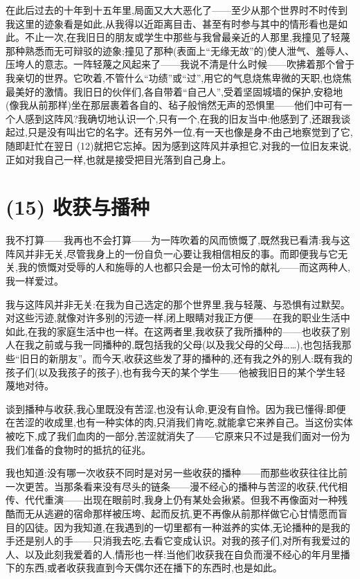 在此后过去的十年到十五年里,局面又大大恶化了——至少从那个世界时不时传到我这里的迹象看是如此,从我得以近距离目击、甚至有时参与其中的情形看也是如此。不止一次,在我旧日的朋友或学生中那些与我曾最亲近的人那里,我撞见了轻蔑那种熟悉而无可辩驳的迹象;撞见了那种(表面上“无缘无故”的)使人泄气、羞辱人、压垮人的意志。一阵轻蔑之风起来了——我说不清是什么时候——吹拂着那个曾于我亲切的世界。它吹着,不管什么“功绩”或“过”,用它的气息烧焦卑微的天职,也烧焦最美好的激情。我旧日的伙伴们,各自带着“自己人”,受着坚固城墙的保护,安稳地(像我从前那样)坐在那层裹着各自的、毡子般悄然无声的恐惧里——他们中可有一个人感到这阵风?我确切地认识一个,只有一个,在我的旧友当中:他感到了,还跟我谈起过,只是没有叫出它的名字。还有另外一位,有一天也像是身不由己地察觉到了它,随即赶忙在翌日 (12)就把它忘掉。因为感到这阵风并承担它,对我的一位旧友来说,
 正如对我自己一样,也就是接受把目光落到自己身上。

\section{(15) 收获与播种}

我不打算——我再也不会打算——为一阵吹着的风而愤慨了,既然我已看清:我与这阵风并非无关,尽管我身上的一份自负一心要让我相信相反的事。而即便我与它无关,我的愤慨对受辱的人和施辱的人也都只会是一份太可怜的献礼——而这两种人,我一样爱过。

我与这阵风并非无关:在我为自己选定的那个世界里,我与轻蔑、与恐惧有过默契。对这些污迹,就像对许多别的污迹一样,闭上眼睛对我正方便——在我的职业生活中如此,在我的家庭生活中也一样。在这两者里,我收获了我所播种的——也收获了别人在我之前或与我一同播种的,既包括我的父母(以及我父母的父母……),也包括我那些“旧日的新朋友”。而今天,收获这些发了芽的播种的,还有我之外的别人:既有我的孩子们(以及我孩子的孩子),也有我今天的某个学生——他被我旧日的某个学生轻蔑地对待。

谈到播种与收获,我心里既没有苦涩,也没有认命,更没有自怜。因为我已懂得:即便在苦涩的收成里,也有一种实体的肉,只消我们肯吃,就能拿它来养自己。当这份实体被吃下,成了我们血肉的一部分,苦涩就消失了——它原来只不过是我们面对一份为我们准备的食物时的抵抗的征兆。

我也知道:没有哪一次收获不同时是对另一些收获的播种——而那些收获往往比前一次更苦。当那条看来没有尽头的链条——漫不经心的播种与苦涩的收获,代代相传、代代重演——出现在眼前时,我身上仍有某处会揪紧。但我不再像面对一种残酷而无从逃避的宿命那样被压垮、起而反抗,更不再像从前那样做它心甘情愿而盲目的囚徒。因为我知道,在我遇到的一切里都有一种滋养的实体,无论播种的是我的手还是别人的手——只消我去吃,去看它变成认识。对我的孩子们,对所有我爱过的人、以及此刻我爱着的人,情形也一样:当他们收获我在自负而漫不经心的年月里播下的东西,或者收获我直到今天偶尔还在播下的东西时,也是如此。
